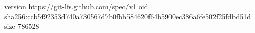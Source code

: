 version https://git-lfs.github.com/spec/v1
oid sha256:ccb5f92353d740a730567d7b0fbb584620f64b5900ec386a6fe502f25fdbd51d
size 786528
